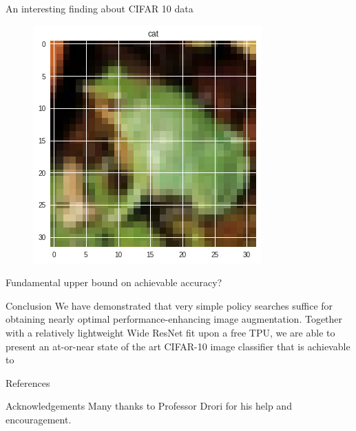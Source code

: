 \documentclass[final]{beamer}
\newlength{\onecolwid}
\begin{document}
\begin{frame}[t]
\begin{columns}[t]
\begin{column}{\onecolwid}
\begin{block}{An interesting finding about CIFAR 10 data}
\begin{figure}
\centering
\includegraphics[width=0.70\linewidth]{catfrog.png}
\end{figure}

Fundamental upper bound on achievable accuracy?
\end{block}


\begin{block}{Conclusion}
We have demonstrated that very simple policy searches suffice for obtaining nearly optimal performance-enhancing image augmentation. Together with a relatively lightweight Wide ResNet fit upon a free TPU, we are able to present an at-or-near state of the art CIFAR-10 image classifier that is achievable to 

\end{block}

\begin{block}{References}
{\small


}
\end{block}

\begin{block}{Acknowledgements}
Many thanks to Professor Drori for his help and encouragement. \\
\end{block}



\end{column}
\end{columns}
\end{frame}
\end{document}
